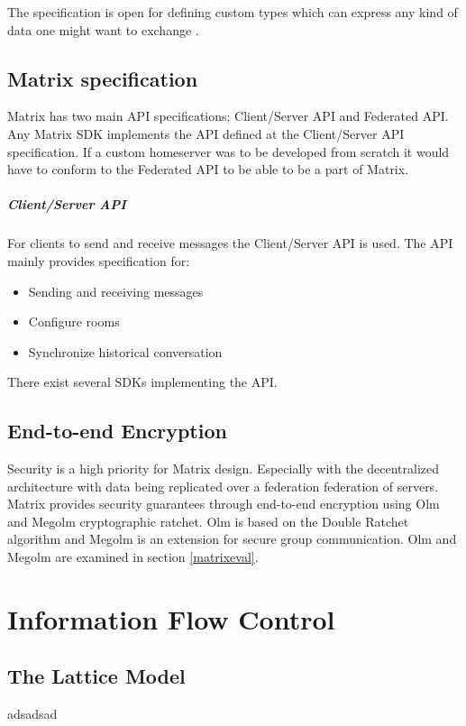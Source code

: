 The specification is open for defining custom types which can express any kind of data one might want to exchange \cite{typeofevent}.


\subsection{Matrix specification}
Matrix has two main API specifications; Client/Server API and Federated API. Any Matrix SDK implements the API defined at the Client/Server API specification. If a custom homeserver was to be developed from scratch it would have to conform to the Federated API to be able to be a part of Matrix. 

\subparagraph{Client/Server API}
For clients to send and receive messages the Client/Server API is used. The API mainly provides specification for:

\begin{itemize}
	\item Sending and receiving messages
	\item Configure rooms
	\item Synchronize historical conversation
\end{itemize}

 There exist several SDKs implementing the API.  

\subsection{End-to-end Encryption}
Security is a high priority for Matrix design. Especially with the decentralized architecture with data being replicated over a federation federation of servers. Matrix provides security guarantees through end-to-end encryption using Olm and Megolm cryptographic ratchet. Olm is based on the Double Ratchet algorithm and Megolm is an extension for secure group communication. Olm and Megolm are examined in section \ref{matrixeval}.



\newpage
\section{Information Flow Control} %

\subsection{The Lattice Model}
adsadsad

